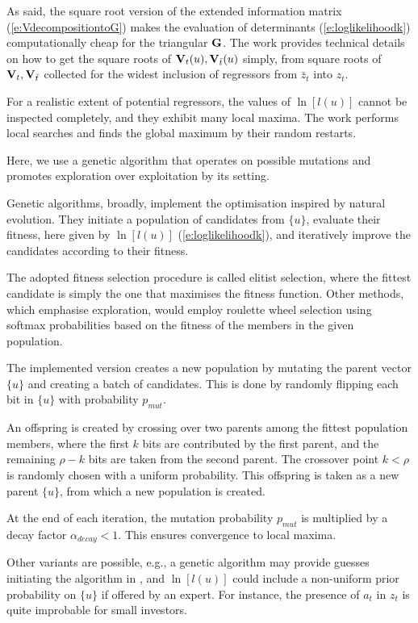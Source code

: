 As said, the square root version of the extended information matrix (\ref{e:VdecompositiontoG}) makes the evaluation of determinants (\ref{e:loglikelihoodk}) computationally cheap for the triangular $\mathbf{G}$. The work \cite{KarKul:88} provides technical details on how to get the square roots of $\mathbf{V}_{t}(u),\mathbf{V}_{\bar{t}}(u)$ simply, from square roots of $\mathbf{V}_{t},\mathbf{V}_{\bar{t}}$ collected for the widest inclusion of regressors from $\bar{z}_{t}$ into $z_{t}$.

For a realistic extent of potential regressors, the values of $\ln[l(u)]$ cannot be inspected completely, and they exhibit many local maxima. The work \cite{KarKul:88} performs local searches and finds the global maximum by their random restarts.

Here, we use a genetic algorithm \cite{haldurai2016study} that operates on possible mutations and promotes exploration over exploitation by its setting.

Genetic algorithms, broadly, implement the optimisation inspired by natural evolution. They initiate a population of candidates from $\{u\}$, evaluate their fitness, here given by $\ln[l(u)]$ (\ref{e:loglikelihoodk}), and iteratively improve the candidates according to their fitness.

The adopted fitness selection procedure is called elitist selection, where the fittest candidate is simply the one that maximises the fitness function. Other methods, which emphasise exploration, would employ roulette wheel selection using softmax probabilities based on the fitness of the members in the given population.

The implemented version creates a new population by mutating the parent vector $\{u\}$ and creating a batch of candidates. This is done by randomly flipping each bit in $\{u\}$ with probability $p_{mut}$.

An offspring is created by crossing over two parents among the fittest population members, where the first $k$ bits are contributed by the first parent, and the remaining $\rho-k$ bits are taken from the second parent. The crossover point $k<\rho$ is randomly chosen with a uniform probability. This offspring is taken as a new parent $\{u\}$, from which a new population is created.

At the end of each iteration, the mutation probability $p_{mut}$ is multiplied by a decay factor $\alpha_{decay} <1$. This ensures convergence to local maxima.

Other variants are possible, e.g., a genetic algorithm may provide guesses initiating the algorithm in \cite{KarKul:88}, and $\ln[l(u)]$ could include a non-uniform prior probability on $\{u\}$ if offered by an expert. For instance, the presence of $a_{t}$ in $z_{t}$ is quite improbable for small investors.

